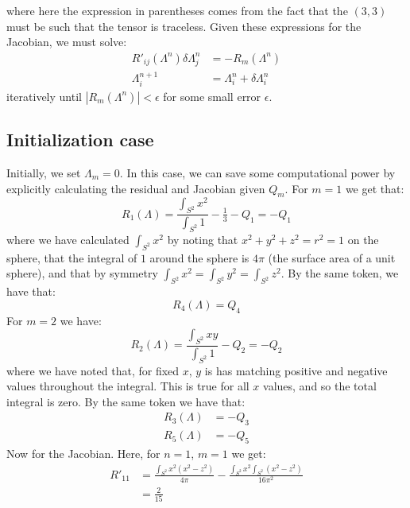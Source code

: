 \documentclass[reqno]{article}
\begin{document}
	where here the expression in parentheses comes from the fact that the $(3, 3)$ must be such that the tensor is traceless.
	Given these expressions for the Jacobian, we must solve:
	\begin{align}
	R'_{ij} (\Lambda^n) \delta \Lambda^n_j &= -R_m (\Lambda^n) \\
	\Lambda^{n + 1}_{i} &= \Lambda^n_{i} + \delta \Lambda^n_i
	\end{align}
	iteratively until $\left| R_m (\Lambda^n) \right| < \epsilon$ for some small error $\epsilon$.
	
	\subsection{Initialization case}
	Initially, we set $\Lambda_{m} = 0$.
	In this case, we can save some computational power by explicitly calculating the residual and Jacobian given $Q_m$.
	For $m = 1$ we get that:
	\begin{equation}
		R_1 (\Lambda)
		= \frac{\int_{S^2} x^2}{\int_{S^2} 1}
		- \tfrac13 - Q_1
		= -Q_1
	\end{equation}
	where we have calculated $\int_{S^2} x^2$ by noting that $x^2 + y^2 + z^2 = r^2 = 1$ on the sphere, that the integral of $1$ around the sphere is $4\pi$ (the surface area of a unit sphere), and that by symmetry $\int_{S^2} x^2 = \int_{S^2} y^2 = \int_{S^2} z^2$.
	By the same token, we have that:
	\begin{equation}
		R_4 (\Lambda) = Q_4
	\end{equation}
	For $m = 2$ we have:
	\begin{equation}
		R_2 (\Lambda)
		= \frac{\int_{S^2} xy}{\int_{S^2} 1} - Q_2
		= -Q_2
	\end{equation}
	where we have noted that, for fixed $x$, $y$ is has matching positive and negative values throughout the integral.
	This is true for all $x$ values, and so the total integral is zero.
	By the same token we have that:
	\begin{align}
		R_3(\Lambda) &= -Q_3 \\
		R_5(\Lambda) &= -Q_5
	\end{align}
	Now for the Jacobian.
	Here, for $n = 1$, $m = 1$ we get:
	\begin{equation}
	\begin{split}
		R'_{11} 
		&=
		\frac{\int_{S^2} x^2 (x^2 - z^2)}{4\pi}
		- \frac{\int_{S^2} x^2 \int_{S^2} (x^2 - z^2)}{16 \pi^2} \\
		&= \frac{2}{15}
	\end{split}
	\end{equation}
\end{document}
